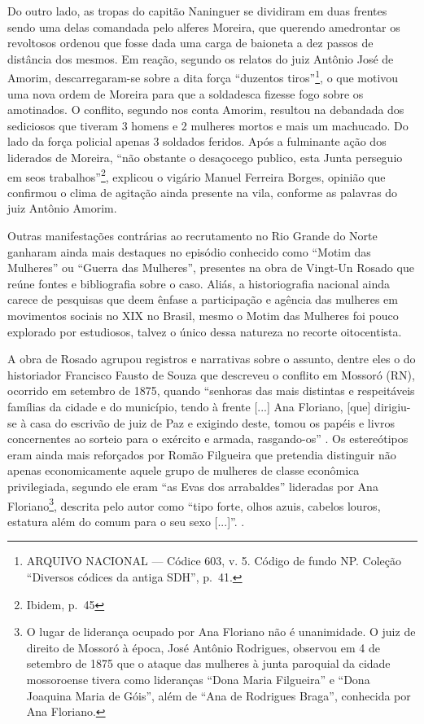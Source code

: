 \begin{refsection}
Do outro lado, as tropas do capitão Naninguer se dividiram em duas frentes sendo uma delas comandada pelo alferes Moreira, que querendo amedrontar os revoltosos ordenou que fosse dada uma carga de baioneta a dez passos de distância dos mesmos. Em reação, segundo os relatos do juiz Antônio José de Amorim, descarregaram-se sobre a dita força “duzentos tiros”\footnote{ARQUIVO NACIONAL --- Códice 603, v. 5. Código de fundo NP. Coleção “Diversos códices da antiga SDH”, p.~41.}, o que motivou uma nova ordem de Moreira para que a soldadesca fizesse fogo sobre os amotinados. O conflito, segundo nos conta Amorim, resultou na debandada dos sediciosos que tiveram 3 homens e 2 mulheres mortos e mais um machucado. Do lado da força policial apenas 3 soldados feridos. Após a fulminante ação dos liderados de Moreira, “não obstante o desaçocego publico, esta Junta perseguio em seos trabalhos”\footnote{Ibidem, p.~45}, explicou o vigário Manuel Ferreira Borges, opinião que confirmou o clima de agitação ainda presente na vila, conforme as palavras do juiz Antônio Amorim. 

Outras manifestações contrárias ao recrutamento no Rio Grande do Norte ganharam ainda mais destaques no episódio conhecido como “Motim das Mulheres” ou “Guerra das Mulheres”, presentes na obra de Vingt-Un Rosado que reúne fontes e bibliografia sobre o caso. Aliás, a historiografia nacional ainda carece de pesquisas que deem ênfase a participação e agência das mulheres em movimentos sociais no XIX no Brasil, mesmo o Motim das Mulheres foi pouco explorado por estudiosos, talvez o único dessa natureza no recorte oitocentista.  

A obra de Rosado agrupou registros e narrativas sobre o assunto, dentre eles o do historiador Francisco Fausto de Souza que descreveu o conflito em Mossoró (RN), ocorrido em setembro de 1875, quando “senhoras das mais distintas e respeitáveis famílias da cidade e do município, tendo à frente [...] Ana Floriano, [que] dirigiu-se à casa do escrivão de juiz de Paz e exigindo deste, tomou os papéis e livros concernentes ao sorteio para o exército e armada, rasgando-os” \cite[p.~2]{Rosado1981}. Os estereótipos eram ainda mais reforçados por Romão Filgueira que pretendia distinguir não apenas economicamente aquele grupo de mulheres de classe econômica privilegiada, segundo ele eram “as Evas dos arrabaldes” lideradas por Ana Floriano\footnote{O lugar de liderança ocupado por Ana Floriano não é unanimidade. O juiz de direito de Mossoró à época, José Antônio Rodrigues, observou em 4 de setembro de 1875 que o ataque das mulheres à junta paroquial da cidade mossoroense tivera como lideranças “Dona Maria Filgueira” e “Dona Joaquina Maria de Góis”, além de “Ana de Rodrigues Braga”, conhecida por Ana Floriano.}, descrita pelo autor como “tipo forte, olhos azuis, cabelos louros, estatura além do comum para o seu sexo [...]”. \cite[p.~3]{Rosado1981}.


\end{refsection}
